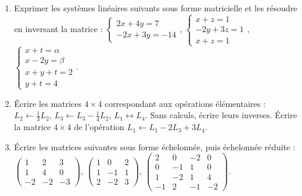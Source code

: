 \begin{frame}

\begin{miniexercice}
\begin{enumerate}
  \item Exprimer les systèmes linéaires suivants sous forme matricielle 
  et les résoudre en inversant la matrice :
  $\left\{\begin{array}{l}2x+4y=7\\-2x+3y=-14\end{array} \right.$,\quad 
  $\left\{\begin{array}{l}x+z=1\\-2y+3z=1\\x+z=1\end{array} \right.$,\quad 
  $\left\{\begin{array}{l}x+t=\alpha\\x-2y=\beta\\x+y+t=2\\y+t=4\end{array} \right.$.
  
  
  \item \'Ecrire les matrices $4\times 4$ correspondant aux opérations élémentaires :
  $L_2 \leftarrow \frac13 L_2$, $L_3 \leftarrow L_3-\frac14 L_2$, $L_1 \leftrightarrow L_4$.
  Sans calculs, écrire leurs inverses. \'Ecrire la matrice $4\times 4$ 
  de l'opération $L_1 \leftarrow L_1-2L_3+3L_4$.
  
  \item \'Ecrire les matrices suivantes sous forme échelonnée, puis échelonnée réduite :
  $\left(\begin{smallmatrix}1&2&3\\1&4&0\\-2&-2&-3\end{smallmatrix}\right)$, 
  $\left(\begin{smallmatrix}1&0&2\\1&-1&1\\2&-2&3\end{smallmatrix}\right)$, 
  $\left(\begin{smallmatrix}2&0&-2&0\\0&-1&1&0\\1&-2&1&4\\-1&2&-1&-2\end{smallmatrix}\right)$.

\end{enumerate}
\end{miniexercice}

\end{frame}


